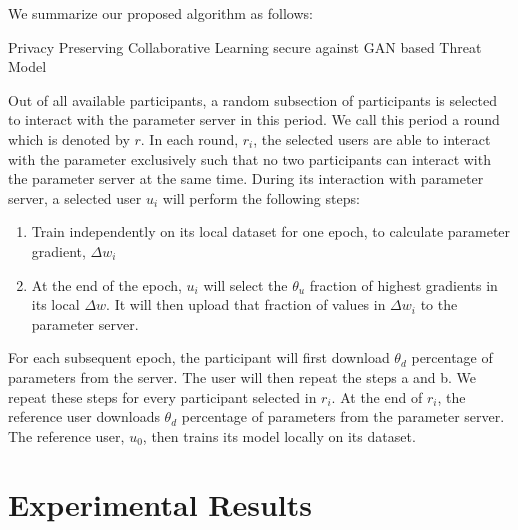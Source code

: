 \documentclass[conference]{IEEEtran}
\begin{document}
We summarize our proposed algorithm as follows:
\begin{algorithm}
  \caption{Privacy Preserving Collaborative Learning secure against GAN based Threat Model}
  \begin{algorithmic}[1]
    \State Out of all available participants, a random subsection of participants is selected to interact with the parameter server in this
period. We call this period a round which is denoted by $r$. In each round, $r_i$, the selected users are able to interact with the parameter exclusively such that no two
participants can interact with the parameter server at the same time.
    \State During its interaction with parameter server, a selected user $u_i$ will perform the following steps:
    \begin {enumerate}
  \item Train independently on its local dataset for one epoch, to calculate parameter gradient, $\Delta w_i$ 
  \item  At the end of the epoch, $u_i$ will select the $\theta_u$ fraction of highest gradients in its local $\Delta w$. It will then upload that fraction of values in $\Delta w_i$ to the parameter server.
  \end {enumerate}
    \State  For each subsequent epoch, the participant will first download $\theta_d$ percentage of parameters from the server. The
user will then repeat the steps a and b. We repeat these steps for every participant selected in $r_i$.
    \State At the end of $r_i$, the reference user downloads $\theta_d$ percentage of parameters from the parameter server.
	\State The reference user, $u_0$, then trains its model locally on its dataset. 
  \end{algorithmic}
\end{algorithm}






\section{Experimental Results}
\end{document}
